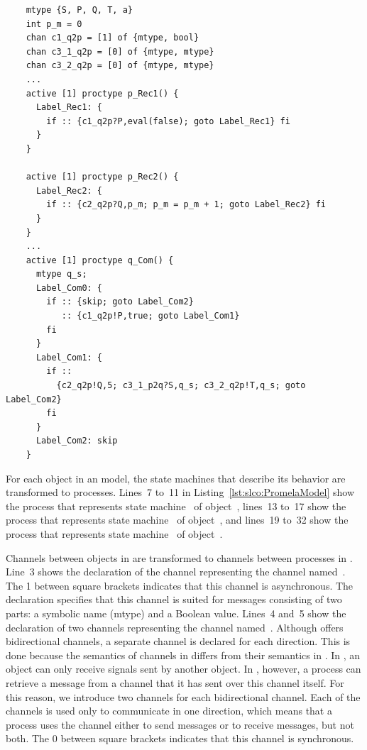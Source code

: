 \begin{listing}
  \lstset{
    language=promela,
    label=lst:slco:PromelaModel,
    caption=Part of a \Promela model,
    numbers=left
  }
  \begin{lstlisting}
    mtype {S, P, Q, T, a}
    int p_m = 0
    chan c1_q2p = [1] of {mtype, bool}
    chan c3_1_q2p = [0] of {mtype, mtype}
    chan c3_2_q2p = [0] of {mtype, mtype}
    ...
    active [1] proctype p_Rec1() {
      Label_Rec1: {
        if :: {c1_q2p?P,eval(false); goto Label_Rec1} fi
      }
    }

    active [1] proctype p_Rec2() {
      Label_Rec2: {
        if :: {c2_q2p?Q,p_m; p_m = p_m + 1; goto Label_Rec2} fi
      }
    }
    ...
    active [1] proctype q_Com() {
      mtype q_s;
      Label_Com0: {
        if :: {skip; goto Label_Com2}
           :: {c1_q2p!P,true; goto Label_Com1}
        fi
      }
      Label_Com1: {
        if ::
          {c2_q2p!Q,5; c3_1_p2q?S,q_s; c3_2_q2p!T,q_s; goto Label_Com2}
        fi
      }
      Label_Com2: skip
    }
  \end{lstlisting}
\end{listing}

For each object in an \SLCO model, the state machines that describe its behavior are transformed to \Promela processes.
Lines~7 to~11 in Listing~\ref{lst:slco:PromelaModel} show the process that represents state machine~ of object~, lines~13 to~17 show the process that represents state machine~ of object~, and lines~19 to~32 show the process that represents state machine~ of object~.

Channels between objects in \SLCO are transformed to channels between processes in \Promela.
Line~3 shows the declaration of the \Promela channel representing the \SLCO channel named~.
The 1 between square brackets indicates that this channel is asynchronous.
The declaration specifies that this channel is suited for messages consisting of two parts: a symbolic name (mtype) and a Boolean value.
Lines~4 and~5 show the declaration of two channels representing the \SLCO channel named~.
Although \Promela offers bidirectional channels, a separate channel is declared for each direction.
This is done because the semantics of channels in \Promela differs from their semantics in \SLCO.
In \SLCO, an object can only receive signals sent by another object.
In \Promela, however, a process can retrieve a message from a channel that it has sent over this channel itself.
For this reason, we introduce two \Promela channels for each bidirectional \SLCO channel.
Each of the \Promela channels is used only to communicate in one direction, which means that a process uses the channel either to send messages or to receive messages, but not both.
The 0 between square brackets indicates that this channel is synchronous.


